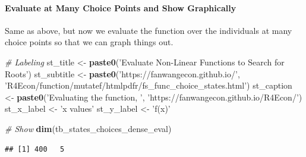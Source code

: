 \documentclass[
]{book}
\newenvironment{Shaded}{\begin{snugshade}}{\end{snugshade}}
\newcommand{\CommentTok}[1]{\textcolor[rgb]{0.56,0.35,0.01}{\textit{#1}}}
\newcommand{\DataTypeTok}[1]{\textcolor[rgb]{0.13,0.29,0.53}{#1}}
\newcommand{\KeywordTok}[1]{\textcolor[rgb]{0.13,0.29,0.53}{\textbf{#1}}}
\newcommand{\NormalTok}[1]{#1}
\newcommand{\OperatorTok}[1]{\textcolor[rgb]{0.81,0.36,0.00}{\textbf{#1}}}
\newcommand{\StringTok}[1]{\textcolor[rgb]{0.31,0.60,0.02}{#1}}
\begin{document}
\hypertarget{evaluate-at-many-choice-points-and-show-graphically}{%
\paragraph{Evaluate at Many Choice Points and Show Graphically}\label{evaluate-at-many-choice-points-and-show-graphically}}

Same as above, but now we evaluate the function over the individuals at many choice points so that we can graph things out.

\begin{Shaded}
\end{Shaded}

\begin{Shaded}
\begin{Highlighting}[]
\CommentTok{# Labeling}
\NormalTok{st_title <-}\StringTok{ }\KeywordTok{paste0}\NormalTok{(}\StringTok{'Evaluate Non-Linear Functions to Search for Roots'}\NormalTok{)}
\NormalTok{st_subtitle <-}\StringTok{ }\KeywordTok{paste0}\NormalTok{(}\StringTok{'https://fanwangecon.github.io/'}\NormalTok{,}
                      \StringTok{'R4Econ/function/mutatef/htmlpdfr/fs_func_choice_states.html'}\NormalTok{)}
\NormalTok{st_caption <-}\StringTok{ }\KeywordTok{paste0}\NormalTok{(}\StringTok{'Evaluating the function, '}\NormalTok{,}
                     \StringTok{'https://fanwangecon.github.io/R4Econ/'}\NormalTok{)}
\NormalTok{st_x_label <-}\StringTok{ 'x values'}
\NormalTok{st_y_label <-}\StringTok{ 'f(x)'}

\CommentTok{# Show}
\KeywordTok{dim}\NormalTok{(tb_states_choices_dense_eval)}
\end{Highlighting}
\end{Shaded}

\begin{verbatim}
## [1] 400   5
\end{verbatim}
\end{document}
